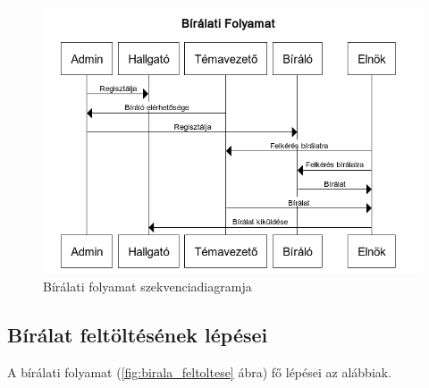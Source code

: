 \begin{figure}[h]
\centering
\includegraphics[scale=0.8]{images/Bírálati_folyamat.png}
\caption{Bírálati folyamat szekvenciadiagramja}
\label{fig:biralati_folyamat}
\end{figure}

\subsection{Bírálat feltöltésének lépései}

A bírálati folyamat (\ref{fig:birala_feltoltese} ábra) fő lépései az alábbiak.

